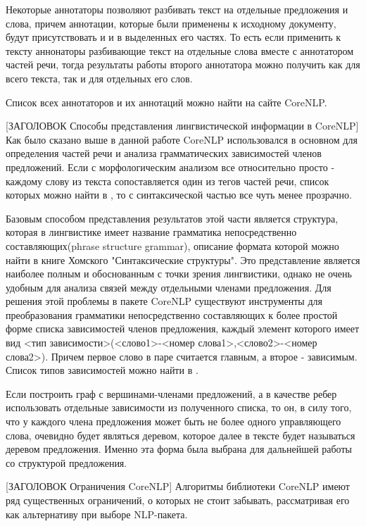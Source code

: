 Некоторые аннотаторы позволяют разбивать текст на отдельные предложения и слова,
причем аннотации, которые были применены к исходному документу, будут присутствовать и
и в выделенных его частях. 
То есть если применить к тексту аннонаторы разбивающие текст на отдельные слова
вместе с аннотатором частей речи, тогда результаты работы второго аннотатора
можно получить как для всего текста, так и для отдельных его слов.

Список всех аннотаторов и их аннотаций можно найти на сайте CoreNLP\cite{corenlp}.

[ЗАГОЛОВОК Способы представления лингвистической информации в CoreNLP]
Как было сказано выше в данной работе CoreNLP использовался в основном для 
определения частей речи и анализа грамматических зависимостей
членов предложений.
Если с морфологическим анализом все относительно просто - каждому слову
из текста сопоставляется один из тегов частей речи, список которых можно найти в \cite{treebank},
то с синтаксической частью все чуть менее прозрачно.

Базовым способом представления результатов этой части является структура,
которая в лингвистике имеет название грамматика непосредственно составляющих(phrase structure grammar), 
описание формата которой можно найти в книге Хомского "Синтаксические структуры"\cite{homsky}.
Это представление является наиболее полным и обоснованным с точки зрения лингвистики, 
однако не очень удобным для анализа связей между отдельными членами предложения.
Для решения этой проблемы в пакете CoreNLP существуют инструменты для 
преобразования грамматики непосредственно составляющих к более простой форме
списка зависимостей членов предложения, каждый элемент которого имеет вид 
<тип зависимости>(<слово1>-<номер слова1>,<слово2>-<номер слова2>).
Причем первое слово в паре считается главным, а второе - зависимым.
Список типов зависимостей можно найти в \cite{dependencies}.

Если построить граф с вершинами-членами предложений, а в качестве ребер использовать 
отдельные зависимости из полученного списка, то он, в силу того, что у каждого члена
предложения может быть не более одного управляющего слова, очевидно будет
являться деревом, которое далее в тексте будет называться деревом предложения.
Именно эта форма была выбрана для дальнейшей работы со структурой
предложения.


[ЗАГОЛОВОК Ограничения CoreNLP]
Алгоритмы библиотеки CoreNLP имеют ряд существенных ограничений, 
о которых не стоит забывать, рассматривая его как альтернативу
при выборе NLP-пакета.


